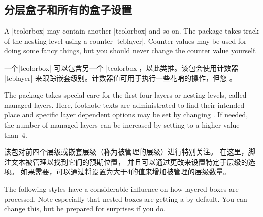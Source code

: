 \setcounter{section}{4}
\setcounter{subsection}{15}
\setcounter{subsubsection}{5} 
\subsection{分层盒子和所有的盒子设置}\label{subsec:everybox}

A |tcolorbox| may contain another |tcolorbox| and so on. The package
takes track of the nesting level using a counter |tcblayer|. Counter values
may be used for doing some fancy things, but you should never change
the counter value yourself.

一个|tcolorbox| 可以包含另一个 |tcolorbox|，以此类推。该包会使用计数器 |tcblayer| 来跟踪嵌套级别。计数器值可用于执行一些花哨的操作，但您%
。


The package takes special care for the first four layers or nesting levels,
called managed layers.
Here, footnote texts are administrated to find their intended place
and specific layer dependent options may be set by changing
.
If needed, the number of managed layers can be increased by setting
 to a higher value than~4.

该包对前四个层级或嵌套层级（称为被管理的层级）进行特别关注。 在这里，脚注文本被管理以找到它们的预期位置， 并且可以通过更改来设置特定于层级的选项。 如果需要，可以通过将设置为大于4的值来增加被管理的层级数量。



The following styles have a considerable influence on how layered boxes
are processed. Note especially that nested boxes are getting a
 by default. You can change this, but be prepared for
surprises if you do.

